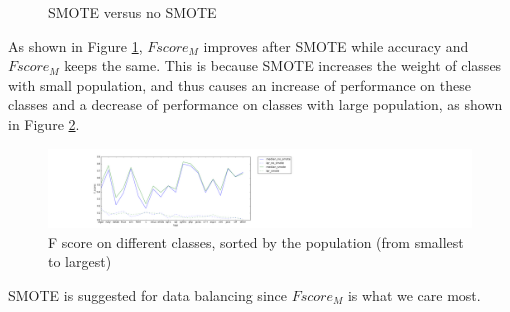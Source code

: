 \documentclass{sig-alternate-05-2015}
\begin{document}
\begin{figure}[ht]
    \centering
    \quad
    \quad
    \caption{SMOTE versus no SMOTE}
    \label{fig:SVM}
\end{figure}

As shown in Figure \ref{fig:SVM}, $Fscore_{M}$ improves after SMOTE while accuracy and $Fscore_{M}$ keeps the same. This is because SMOTE increases the weight of classes with small population, and thus causes an increase of performance on these classes and a decrease of performance on classes with large population, as shown in Figure \ref{fig:SVM_tags}.

\begin{figure}[ht]
  \includegraphics[width=\linewidth]{./fig/SVM_tags.png}
  \caption{F score on different classes, sorted by the population (from smallest to largest)}
  \label{fig:SVM_tags}
\end{figure}

SMOTE is suggested for data balancing since $Fscore_{M}$ is what we care most.
\end{document}
